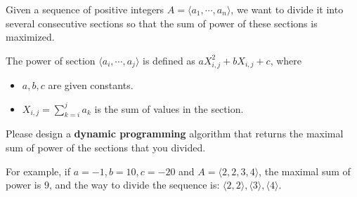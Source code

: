 
Given a sequence of positive integers $A=\langle a_1,\cdots,a_n\rangle$, we want to divide it into several consecutive sections so that the sum of power of these sections
is maximized.

The power of section $\langle a_i,\cdots,a_j\rangle$ is defined as $aX_{i,j}^2+bX_{i,j}+c$, where
\begin{itemize}
    \item $a,b,c$ are given constants.
    \item $X_{i,j}=\sum\limits_{k=i}^j a_k$ is the sum of values in the section.
\end{itemize}

Please design a \textbf{dynamic programming} algorithm that returns the maximal sum of power of the sections that you divided.

For example, if \(a=-1,b=10,c=-20\) and \(A=\langle 2,2,3,4\rangle\), the maximal sum of power is \(9\), and the way to divide the sequence is: \(\langle 2,2\rangle,\langle 3\rangle,\langle 4\rangle\).

